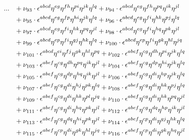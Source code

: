 \documentclass[a4paper,12pt, DIV=14, BCOR=5mm, twoside, headsepline]{scrbook}
\begin{document}
\begin{align}\label{LorentzArea3}
\begin{alignedat}{2}
\hphantom{\boldsymbol{a^{ABpCq}}}&\hphantom{:} \ \ \ & \hphantom{a^{abcdefghpijklq}} ...  &\hphantom{=} +
\nu_{93}\cdot\epsilon^{abcd}\eta^{eg}\eta^{fh}\eta^{pi}\eta^{jk}\eta^{lq}+\nu_{94}\cdot\epsilon^{abcd}\eta^{eg}\eta^{fh}\eta^{pq}\eta^{ik}\eta^{jl}\\
& & &\hphantom{=}
+\nu_{95}\cdot\epsilon^{abcd}\eta^{eg}\eta^{fp}\eta^{hi}\eta^{jk}\eta^{lq}+\nu_{96}\cdot\epsilon^{abcd}\eta^{eg}\eta^{fi}\eta^{hk}\eta^{pj}\eta^{lq}\\
& & &\hphantom{=}
+\nu_{97}\cdot\epsilon^{abcd}\eta^{eg}\eta^{fi}\eta^{hk}\eta^{pq}\eta^{jl}+\nu_{98}\cdot\epsilon^{abcd}\eta^{eg}\eta^{fi}\eta^{hq}\eta^{pk}\eta^{jl}\\
& & &\hphantom{=}
+\nu_{99}\cdot\epsilon^{abcd}\eta^{ep}\eta^{fi}\eta^{gj}\eta^{hk}\eta^{lq}+\nu_{100}\cdot\epsilon^{abcd}\eta^{ep}\eta^{fi}\eta^{gk}\eta^{hl}\eta^{jq}\\
& & &\hphantom{=}
+\nu_{101}\cdot\epsilon^{abcd}\eta^{ei}\eta^{fj}\eta^{gk}\eta^{hl}\eta^{pq}+\nu_{102}\cdot\epsilon^{abef}\eta^{cg}\eta^{dh}\eta^{pi}\eta^{jk}\eta^{lq}\\
& & &\hphantom{=}
+\nu_{103}\cdot\epsilon^{abef}\eta^{cg}\eta^{dh}\eta^{pq}\eta^{ik}\eta^{jl}+\nu_{104}\cdot\epsilon^{abef}\eta^{cg}\eta^{dp}\eta^{hi}\eta^{jk}\eta^{lq}\\
& & &\hphantom{=}
+\nu_{105}\cdot\epsilon^{abef}\eta^{cg}\eta^{dp}\eta^{hq}\eta^{ik}\eta^{jl}+\nu_{106}\cdot\epsilon^{abef}\eta^{cg}\eta^{di}\eta^{hp}\eta^{jk}\eta^{lq}\\
& & &\hphantom{=}
+\nu_{107}\cdot\epsilon^{abef}\eta^{cg}\eta^{di}\eta^{hj}\eta^{pk}\eta^{lq}+\nu_{108}\cdot\epsilon^{abef}\eta^{cg}\eta^{di}\eta^{hk}\eta^{pj}\eta^{lq}\\
& & &\hphantom{=}
+\nu_{109}\cdot\epsilon^{abef}\eta^{cg}\eta^{di}\eta^{hk}\eta^{pl}\eta^{jq}+\nu_{110}\cdot\epsilon^{abef}\eta^{cg}\eta^{di}\eta^{hk}\eta^{pq}\eta^{jl}\\
& & &\hphantom{=}
+\nu_{111}\cdot\epsilon^{abef}\eta^{cg}\eta^{di}\eta^{hq}\eta^{pk}\eta^{jl}+\nu_{112}\cdot\epsilon^{abef}\eta^{cg}\eta^{dq}\eta^{hp}\eta^{ik}\eta^{jl}\\
& & &\hphantom{=}
+\nu_{113}\cdot\epsilon^{abef}\eta^{cg}\eta^{dq}\eta^{hi}\eta^{pk}\eta^{jl}+\nu_{114}\cdot\epsilon^{abef}\eta^{cp}\eta^{di}\eta^{gj}\eta^{hk}\eta^{lq}\\
& & &\hphantom{=}
+\nu_{115}\cdot\epsilon^{abef}\eta^{cp}\eta^{di}\eta^{gk}\eta^{hl}\eta^{jq}+\nu_{116}\cdot\epsilon^{abef}\eta^{cp}\eta^{di}\eta^{gk}\eta^{hq}\eta^{jl}\\

\end{alignedat}
\end{align}
\end{document}
